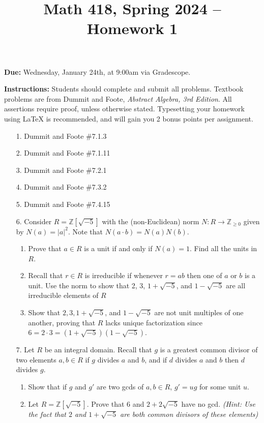 \documentclass[12pt]{article}
\title{Math 418, Spring 2024 -- Homework 1}
\date{}
\newcommand{\Z}{\mathbb{Z}}
\begin{document}
 \maketitle
\vspace{-80pt}

\textbf{Due:} Wednesday, January 24th, at 9:00am via Gradescope.

\textbf{Instructions:} Students should complete and submit all problems. Textbook problems are from Dummit and Foote, \emph{Abstract Algebra, 3rd Edition}. All assertions require proof, unless otherwise stated. Typesetting your homework using LaTeX is recommended, and will gain you 2 bonus points per assignment.

\begin{enumerate}

\item[1.] Dummit and Foote \#7.1.3

\item[2.] Dummit and Foote \#7.1.11

\item[3.] Dummit and Foote \#7.2.1

\item[4.] Dummit and Foote \#7.3.2

\item[5.] Dummit and Foote \#7.4.15

\item[6.] Consider $R = \Z[\sqrt{-5}]$ with the (non-Euclidean) norm $N:R\to \Z_{\ge 0}$ given by $N(a) = |a|^2$. Note that $N(a\cdot b) = N(a)N(b)$.

\begin{enumerate}
    \item Prove that $a\in R$ is a unit if and only if $N(a) = 1$. Find all the units in $R$.
    \item Recall that $r\in R$ is irreducible if whenever $r = ab$ then one of $a$ or $b$ is a unit. Use the norm to show that 2, 3, $1+\sqrt{-5}$, and $1-\sqrt{-5}$ are all irreducible elements of $R$
    \item Show that $2, 3, 1 + \sqrt{-5}$, and $1 - \sqrt{-5}$ are not unit multiples of one another, proving that $R$ lacks unique factorization since $6 = 2\cdot 3 = (1+\sqrt{-5})(1-\sqrt{-5})$.
\end{enumerate}

 
\item[7.] Let $R$ be an integral domain. Recall that $g$ is a greatest common divisor of two elements $a, b\in R$
if $g$ divides $a$ and $b$, and if $d$ divides $a$ and $b$ then $d$ divides $g$.

\begin{enumerate}
    \item Show that if $g$ and $g'$ are two gcds of $a,b\in R$, $g' = ug$ for some unit $u$.
    \item Let $R = \Z[\sqrt{-5}]$. Prove that $6$ and $2+2\sqrt{-5}$ have no gcd. \emph{(Hint: Use the fact that $2$ and $1+\sqrt{-5}$ are both common divisors of these elements)}
\end{enumerate}

\end{enumerate}
\end{document}
